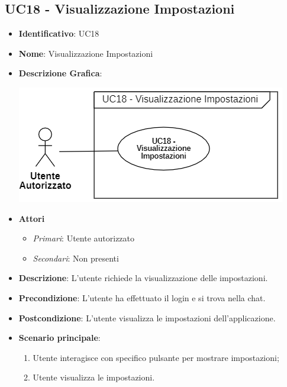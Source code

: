 \subsection{UC18 - Visualizzazione Impostazioni}
\begin{itemize}
	\item \textbf{Identificativo}: UC18
	\item \textbf{Nome}: Visualizzazione Impostazioni
	\item\textbf{Descrizione Grafica}: 
	\begin{center}
		\includegraphics[scale=0.80]{images/UC18.png} 
	\end{center}

	\item \textbf{Attori}
	\begin{itemize} 
		\item \textit{Primari}: Utente autorizzato
		\item \textit{Secondari}: Non presenti
	\end{itemize}
	\item \textbf{Descrizione}: L'utente richiede la visualizzazione delle impostazioni.
	\item \textbf{Precondizione}: L'utente ha effettuato il login e si trova nella chat.
	\item \textbf{Postcondizione}: L'utente visualizza le impostazioni dell'applicazione.
	\item \textbf{Scenario principale}: \begin{enumerate}
		\item Utente interagisce con specifico pulsante per mostrare impostazioni;
		\item Utente visualizza le impostazioni.
	\end{enumerate}
\end{itemize}